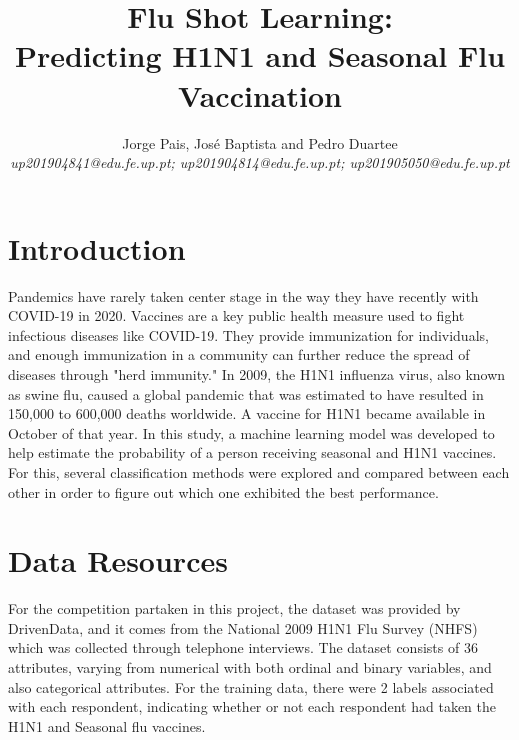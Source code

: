 \documentclass{IEEEtran}
\begin{document}
\title{Flu Shot Learning: \\Predicting H1N1 and Seasonal Flu Vaccination}
\author{Jorge Pais, José Baptista and Pedro Duartee\\ 
    \textit{up201904841@edu.fe.up.pt; up201904814@edu.fe.up.pt; up201905050@edu.fe.up.pt}}

\maketitle

\begin{abstract}
\end{abstract}

\section{Introduction}
Pandemics have rarely taken center stage in the way they have recently with COVID-19 in 2020.  Vaccines are a key public health measure used to fight infectious diseases like COVID-19. They provide immunization for individuals, and enough immunization in a community can further reduce the spread of diseases through "herd immunity." 
In 2009, the H1N1 influenza virus, also known as swine flu, caused a global pandemic that was estimated to have resulted in 150,000 to 600,000 deaths worldwide. A vaccine for H1N1 became available in October of that year. In this study, a machine learning model was developed to help estimate the probability of a person receiving seasonal and H1N1 vaccines. For this, several classification methods were explored and compared between each other in order to figure out which one exhibited the best performance.

\section{Data Resources}

For the competition partaken in this project, the dataset was provided by DrivenData, and it comes from the National 2009 H1N1 Flu Survey (NHFS) which was collected through telephone interviews. The dataset consists of 36 attributes, varying from numerical with both ordinal and binary variables, and also categorical attributes. For the training data, there were 2 labels associated with each respondent, indicating whether or not each respondent had taken the H1N1 and Seasonal flu vaccines.
\end{document}
